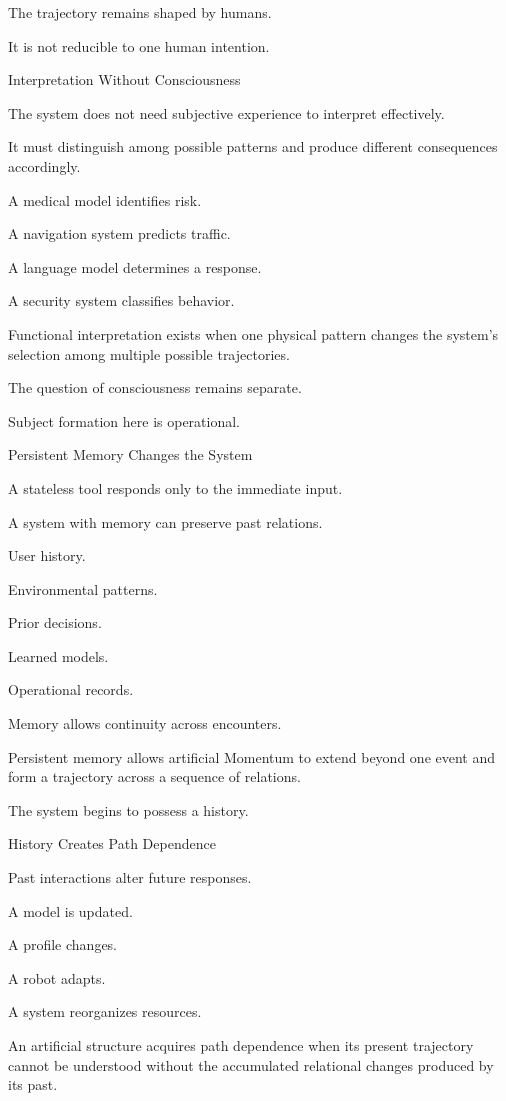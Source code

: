 The trajectory remains shaped by humans.

It is not reducible to one human intention.

Interpretation Without Consciousness

The system does not need subjective experience to interpret effectively.

It must distinguish among possible patterns and produce different consequences accordingly.

A medical model identifies risk.

A navigation system predicts traffic.

A language model determines a response.

A security system classifies behavior.

Functional interpretation exists when one physical pattern changes the system’s selection among multiple possible trajectories.

The question of consciousness remains separate.

Subject formation here is operational.

Persistent Memory Changes the System

A stateless tool responds only to the immediate input.

A system with memory can preserve past relations.

User history.

Environmental patterns.

Prior decisions.

Learned models.

Operational records.

Memory allows continuity across encounters.

Persistent memory allows artificial Momentum to extend beyond one event and form a trajectory across a sequence of relations.

The system begins to possess a history.

History Creates Path Dependence

Past interactions alter future responses.

A model is updated.

A profile changes.

A robot adapts.

A system reorganizes resources.

An artificial structure acquires path dependence when its present trajectory cannot be understood without the accumulated relational changes produced by its past.

